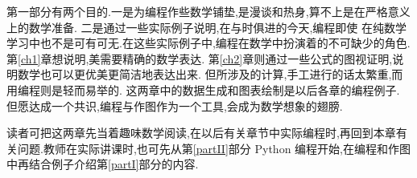 \documentclass[main.tex]{subfiles}
\begin{document}
第一部分有两个目的.一是为编程作些数学铺垫,是漫谈和热身,算不上是在严格意义上的数学准备.
二是通过一些实际例子说明,在与时俱进的今天,编程即使
在纯数学学习中也不是可有可无.在这些实际例子中,编程在数学中扮演着的不可缺少的角色.
第\ref{ch1}章想说明,美需要精确的数学表达.
第\ref{ch2}章则通过一些公式的图视证明,说明数学也可以更优美更简洁地表达出来.
但所涉及的计算,手工进行的话太繁重,而用编程则是轻而易举的.
这两章中的数据生成和图表绘制是以后各章的编程例子.
但愿达成一个共识,编程与作图作为一个工具,会成为数学想象的翅膀.

读者可把这两章先当着趣味数学阅读,在以后有关章节中实际编程时,再回到本章有关问题.教师在实际讲课时,也可先从第\ref{partII}部分 Python 编程开始,在编程和作图中再结合例子介绍第\ref{partI}部分的内容.
\end{document}
